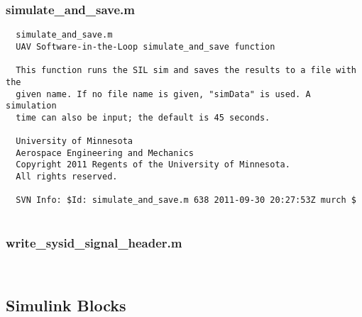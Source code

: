 \documentclass[12pt]{article}
\begin{document}
\subsubsection{simulate\_and\_save.m}
\begin{verbatim}
  simulate_and_save.m
  UAV Software-in-the-Loop simulate_and_save function
 
  This function runs the SIL sim and saves the results to a file with the
  given name. If no file name is given, "simData" is used. A simulation
  time can also be input; the default is 45 seconds.
 
  University of Minnesota 
  Aerospace Engineering and Mechanics 
  Copyright 2011 Regents of the University of Minnesota. 
  All rights reserved.
 
  SVN Info: $Id: simulate_and_save.m 638 2011-09-30 20:27:53Z murch $


\end{verbatim}

\subsubsection{write\_sysid\_signal\_header.m}
\begin{verbatim}


\end{verbatim}

\subsection{Simulink Blocks}
\end{document}
